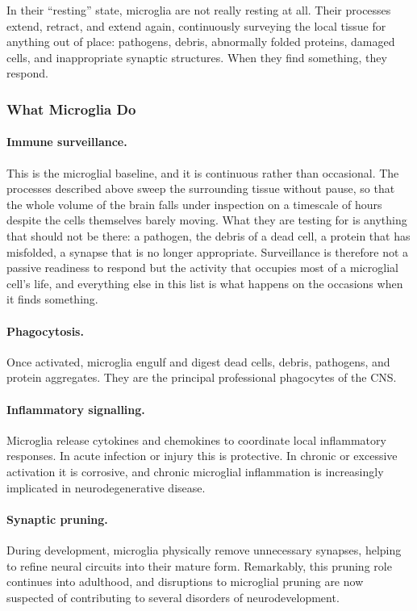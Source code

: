 \documentclass[11pt]{article}
\begin{document}
In their ``resting'' state, microglia are not really resting at all. Their processes extend, retract, and extend again, continuously surveying the local tissue for anything out of place: pathogens, debris, abnormally folded proteins, damaged cells, and inappropriate synaptic structures. When they find something, they respond.

\subsubsection{What Microglia Do}

\paragraph{Immune surveillance.} This is the microglial baseline, and it is continuous rather than occasional. The processes described above sweep the surrounding tissue without pause, so that the whole volume of the brain falls under inspection on a timescale of hours despite the cells themselves barely moving. What they are testing for is anything that should not be there: a pathogen, the debris of a dead cell, a protein that has misfolded, a synapse that is no longer appropriate. Surveillance is therefore not a passive readiness to respond but the activity that occupies most of a microglial cell's life, and everything else in this list is what happens on the occasions when it finds something.

\paragraph{Phagocytosis.} Once activated, microglia engulf and digest dead cells, debris, pathogens, and protein aggregates. They are the principal professional phagocytes of the CNS.

\paragraph{Inflammatory signalling.} Microglia release cytokines and chemokines to coordinate local inflammatory responses. In acute infection or injury this is protective. In chronic or excessive activation it is corrosive, and chronic microglial inflammation is increasingly implicated in neurodegenerative disease.

\paragraph{Synaptic pruning.} During development, microglia physically remove unnecessary synapses, helping to refine neural circuits into their mature form. Remarkably, this pruning role continues into adulthood, and disruptions to microglial pruning are now suspected of contributing to several disorders of neurodevelopment.
\end{document}
